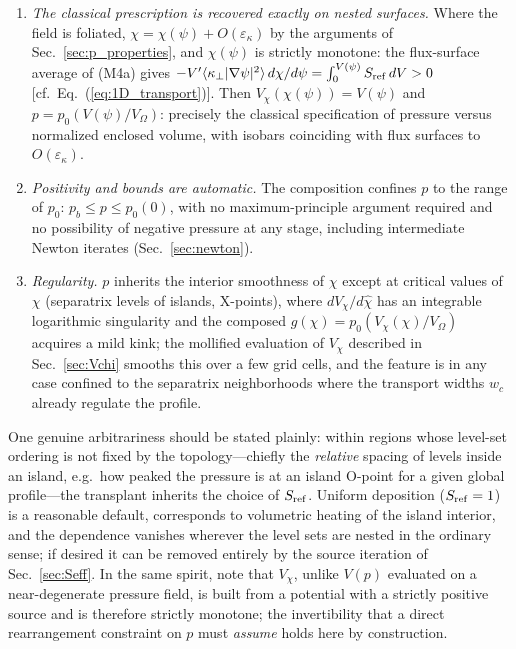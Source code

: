 \documentclass[english]{article}
\begin{document}
\begin{enumerate}
drop across a strongly chaotic annulus thus produces correspondingly steep barrier-localized
gradients; whether such a target is physically sensible is diagnosed through the effective source,
Sec.~\ref{sec:Seff}.)
\item \emph{The classical prescription is recovered exactly on nested surfaces.} Where the field
is foliated, $\chi=\chi(\psi)+O(\varepsilon_\kappa)$ by the arguments of
Sec.~\ref{sec:p_properties}, and $\chi(\psi)$ is strictly monotone: the flux-surface average of
(M4a) gives $-V'\langle\kappa_\perp|\nabla\psi|^{2}\rangle\,d\chi/d\psi=\int_0^{V(\psi)}
S_{\rm ref}\,dV>0$ [cf.~Eq.~(\ref{eq:1D_transport})]. Then $V_\chi(\chi(\psi))=V(\psi)$ and
$p=p_0(V(\psi)/V_\Omega)$: precisely the classical specification of pressure versus normalized
enclosed volume, with
isobars coinciding with flux surfaces to $O(\varepsilon_\kappa)$.
\item \emph{Positivity and bounds are automatic.} The composition confines $p$ to the range of
$p_0$: $p_b\le p\le p_0(0)$, with no maximum-principle argument required and no possibility of
negative pressure at any stage, including intermediate Newton iterates
(Sec.~\ref{sec:newton}).
\item \emph{Regularity.} $p$ inherits the interior smoothness of $\chi$ except at critical values
of $\chi$ (separatrix levels of islands, X-points), where $dV_\chi/d\hat\chi$ has an integrable
logarithmic singularity and the composed $g(\chi)=p_0(V_\chi(\chi)/V_\Omega)$ acquires a mild kink; the mollified
evaluation of $V_\chi$ described in Sec.~\ref{sec:Vchi} smooths this over a few grid cells, and the
feature is in any case confined to the separatrix neighborhoods where the transport widths
$w_c$ already regulate the profile.
\end{enumerate}

One genuine arbitrariness should be stated plainly: within regions whose level-set ordering is not
fixed by the topology---chiefly the \emph{relative} spacing of levels inside an island, e.g.\ how
peaked the pressure is at an island O-point for a given global profile---the transplant inherits
the choice of $S_{\rm ref}$. Uniform deposition ($S_{\rm ref}=1$) is a reasonable default,
corresponds to volumetric heating of the island interior, and the dependence vanishes wherever the
level sets are nested in the ordinary sense; if desired it can be removed entirely by the source
iteration of Sec.~\ref{sec:Seff}. In the same spirit, note that $V_\chi$, unlike $V(p)$ evaluated
on a near-degenerate pressure field, is built from a potential with a strictly positive source and
is therefore strictly monotone; the invertibility that a direct rearrangement constraint on $p$
must \emph{assume} holds here by construction.
\end{document}
